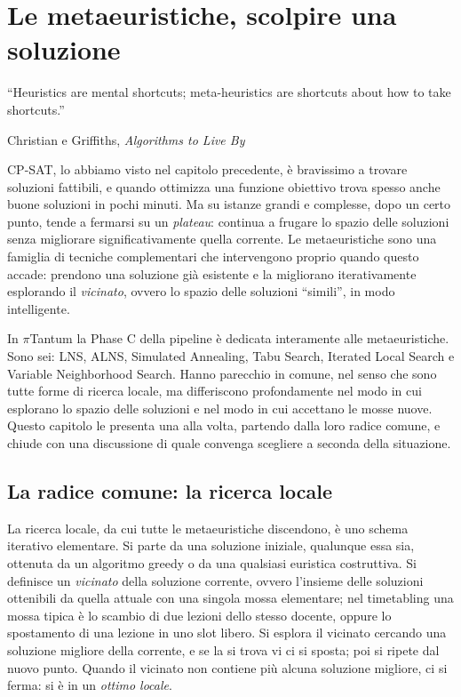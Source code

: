 \chapter{Le metaeuristiche, scolpire una soluzione}
\label{ch:metodo_metaeuristiche}


\epigraph{``Heuristics are mental shortcuts; meta-heuristics are
shortcuts about how to take shortcuts.''}{Christian e
Griffiths, \emph{Algorithms to Live By}~\parencite{christian2016}}

\lettrine[lines=3]{C}{P-SAT}, lo abbiamo visto nel capitolo
precedente, \`e bravissimo a trovare soluzioni fattibili, e
quando ottimizza una funzione obiettivo trova spesso anche
buone soluzioni in pochi minuti. Ma su istanze grandi e
complesse, dopo un certo punto, tende a fermarsi su un
\emph{plateau}: continua a frugare lo spazio delle soluzioni
senza migliorare significativamente quella corrente. Le
metaeuristiche sono una famiglia di tecniche complementari
che intervengono proprio quando questo accade: prendono una
soluzione gi\`a esistente e la migliorano iterativamente
esplorando il \emph{vicinato}, ovvero lo spazio delle
soluzioni ``simili'', in modo intelligente.

In $\pi$Tantum la Phase C della pipeline \`e dedicata
interamente alle metaeuristiche. Sono sei: LNS, ALNS,
Simulated Annealing, Tabu Search, Iterated Local Search e
Variable Neighborhood Search. Hanno parecchio in comune,
nel senso che sono tutte forme di ricerca locale, ma
differiscono profondamente nel modo in cui esplorano lo
spazio delle soluzioni e nel modo in cui accettano le mosse
nuove. Questo capitolo le presenta una alla volta, partendo
dalla loro radice comune, e chiude con una discussione di
quale convenga scegliere a seconda della situazione.

\section{La radice comune: la ricerca locale}

La ricerca locale, da cui tutte le metaeuristiche
discendono, \`e uno schema iterativo elementare. Si parte da
una soluzione iniziale, qualunque essa sia, ottenuta da un
algoritmo greedy o da una qualsiasi euristica costruttiva.
Si definisce un \emph{vicinato} della soluzione corrente,
ovvero l'insieme delle soluzioni ottenibili da quella
attuale con una singola mossa elementare; nel timetabling
una mossa tipica \`e lo scambio di due lezioni dello stesso
docente, oppure lo spostamento di una lezione in uno slot
libero. Si esplora il vicinato cercando una soluzione
migliore della corrente, e se la si trova vi ci si sposta;
poi si ripete dal nuovo punto. Quando il vicinato non
contiene pi\`u alcuna soluzione migliore, ci si ferma: si \`e
in un \emph{ottimo locale}.


